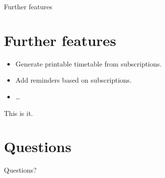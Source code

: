 \documentclass{beamer}
\begin{document}
\begin{frame}{Further features}

	\section{Further features}
	
	\begin{itemize}
		\item Generate printable timetable from subscriptions.
		\item Add reminders based on subscriptions.
		\item \ldots
	\end{itemize}
\end{frame}
	
\begin{frame}{This is it.}
\section{Questions}
Questions?
\end{frame}
\end{document}
